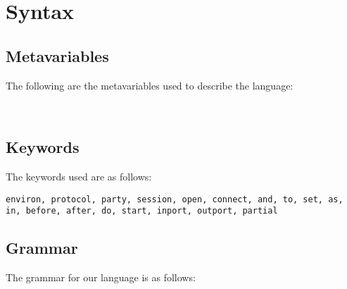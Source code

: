 
\section{Syntax}
\label{sec:syntax-test}

\subsection{Metavariables}
\label{sec:metavar}
The following are the metavariables used to describe the language:

\ottmetavars\\[0pt]

\subsection{Keywords}
The keywords used are as follows:

\texttt{environ, protocol, party, session, open, connect, and, to, set, as, in,
before, after, do, start, inport, outport, partial}

\subsection{Grammar}
The grammar for our language is as follows:
\bigskip

\ottgrammar
